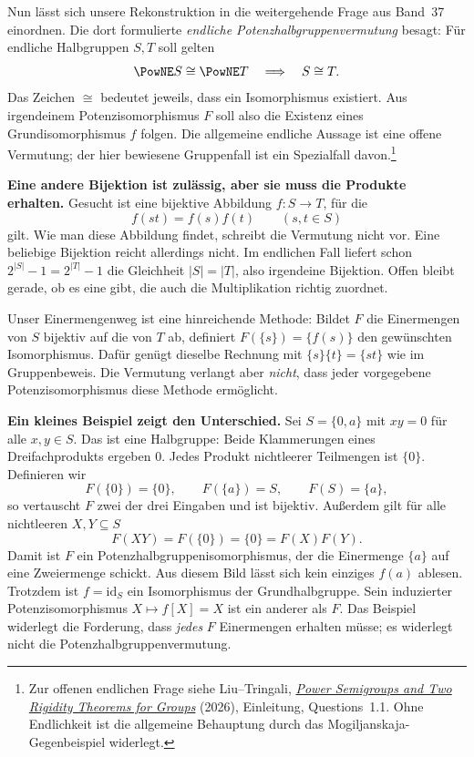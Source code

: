 Nun lässt sich unsere Rekonstruktion in die weitergehende
Frage aus Band~37 einordnen. Die dort formulierte
\emph{endliche Potenzhalbgruppenvermutung} besagt: Für
endliche Halbgruppen \(S,T\) soll gelten
\[
  \PowNE S\cong\PowNE T\quad\Longrightarrow\quad S\cong T.
\]
Das Zeichen \(\cong\) bedeutet jeweils, dass ein Isomorphismus
existiert. Aus irgendeinem Potenzisomorphismus \(F\) soll also
die Existenz eines Grundisomorphismus \(f\) folgen.
Die allgemeine endliche Aussage ist eine offene Vermutung;
der hier bewiesene Gruppenfall ist ein Spezialfall davon.\footnote{Zur
offenen endlichen Frage siehe Liu--Tringali,
\href{https://arxiv.org/html/2606.01917v1}{\emph{Power Semigroups and Two
Rigidity Theorems for Groups}} (2026), Einleitung, Questions~1.1.
Ohne Endlichkeit ist die allgemeine Behauptung durch das
Mogiljanskaja-Gegenbeispiel widerlegt.}

\medskip\noindent\textbf{Eine andere Bijektion ist zulässig,
aber sie muss die Produkte erhalten.}
Gesucht ist eine bijektive Abbildung \(f\colon S\to T\), für die
\[
  f(st)=f(s)f(t)\qquad(s,t\in S)
\]
gilt. Wie man diese Abbildung findet, schreibt die Vermutung
nicht vor. Eine beliebige Bijektion reicht allerdings nicht.
Im endlichen Fall liefert schon
\(2^{|S|}-1=2^{|T|}-1\) die Gleichheit \(|S|=|T|\), also
irgendeine Bijektion. Offen bleibt gerade, ob es eine gibt,
die auch die Multiplikation richtig zuordnet.

Unser Einermengenweg ist eine hinreichende Methode: Bildet
\(F\) die Einermengen von \(S\) bijektiv auf die von \(T\)
ab, definiert \(F(\{s\})=\{f(s)\}\) den gewünschten
Isomorphismus. Dafür genügt dieselbe Rechnung mit
\(\{s\}\{t\}=\{st\}\) wie im Gruppenbeweis.
Die Vermutung verlangt aber \emph{nicht}, dass jeder
vorgegebene Potenzisomorphismus diese Methode ermöglicht.

\medskip\noindent\textbf{Ein kleines Beispiel zeigt den Unterschied.}
Sei \(S=\{0,a\}\) mit \(xy=0\) für alle \(x,y\in S\).
Das ist eine Halbgruppe: Beide Klammerungen eines Dreifachprodukts
ergeben \(0\). Jedes Produkt nichtleerer Teilmengen ist
\(\{0\}\). Definieren wir
\[
  F(\{0\})=\{0\},\qquad
  F(\{a\})=S,\qquad F(S)=\{a\},
\]
so vertauscht \(F\) zwei der drei Eingaben und ist bijektiv.
Außerdem gilt für alle nichtleeren \(X,Y\subseteq S\)
\[
  F(XY)=F(\{0\})=\{0\}=F(X)F(Y).
\]
Damit ist \(F\) ein Potenzhalbgruppenisomorphismus, der die
Einermenge \(\{a\}\) auf eine Zweiermenge schickt. Aus
diesem Bild lässt sich kein einziges \(f(a)\) ablesen.
Trotzdem ist \(f=\mathrm{id}_S\) ein Isomorphismus der
Grundhalbgruppe. Sein induzierter Potenzisomorphismus
\(X\mapsto f[X]=X\) ist ein anderer als \(F\).
Das Beispiel widerlegt die Forderung, dass \emph{jedes}
\(F\) Einermengen erhalten müsse; es widerlegt nicht die
Potenzhalbgruppenvermutung.

